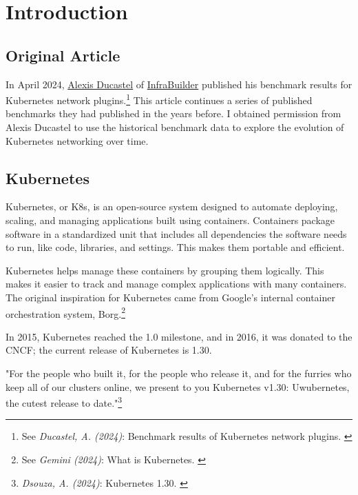 %
%

\pagebreak
\section{Introduction}

\onehalfspacing

\subsection{Original Article}

In April 2024, \href{https://www.linkedin.com/in/alexisducastel/}{Alexis Ducastel} of \href{https://infrabuilder.com/}{InfraBuilder} published his benchmark results for Kubernetes network plugins.\footnote{See \textit{Ducastel, A. (2024)}: Benchmark results of Kubernetes network plugins. \cite{originalArticle}} This article continues a series of published benchmarks they had published in the years before. I obtained permission from Alexis Ducastel to use the historical benchmark data to explore the evolution of Kubernetes networking over time.

\subsection{Kubernetes}

Kubernetes, or K8s, is an open-source system designed to automate deploying, scaling, and managing applications built using containers. Containers package software in a standardized unit that includes all dependencies the software needs to run, like code, libraries, and settings. This makes them portable and efficient.

Kubernetes helps manage these containers by grouping them logically. This makes it easier to track and manage complex applications with many containers. The original inspiration for Kubernetes came from Google's internal container orchestration system, Borg.\footnote{See \textit{Gemini (2024)}: What is Kubernetes. \cite{bardKubernetes}} 

In 2015, Kubernetes reached the 1.0 milestone, and in 2016, it was donated to the CNCF; the current release of Kubernetes is 1.30.

"For the people who built it, for the people who release it, and for the furries who keep all of our clusters online, we present to you Kubernetes v1.30: Uwubernetes, the cutest release to date."\footnote{\textit{Dsouza, A. (2024)}: Kubernetes 1.30. \cite{uwubernetes}}

